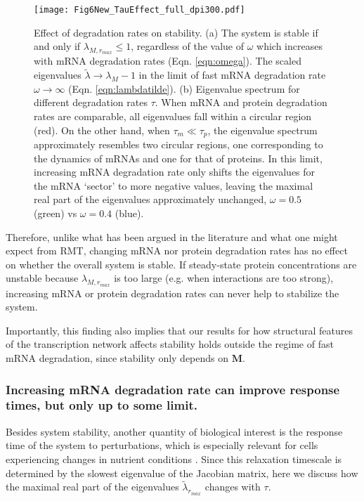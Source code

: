 \documentclass[10pt]{article}
\begin{document}
\begin{figure}[tp]
    \centering
	\texttt{[image: Fig6New\_TauEffect\_full\_dpi300.pdf]}
    \caption{Effect of degradation rates on stability. (a) The system is stable if and only if $\lambda_{M,r_{max}} \leq 1$, regardless of the value of $\omega$ which increases with mRNA degradation rates (Eqn. \ref{eqn:omega}). The scaled eigenvalues $\tilde{\lambda} \to \lambda_M - 1$ in the limit of fast mRNA degradation rate $\omega \to \infty$ (Eqn. \ref{eqn:lambdatilde}). (b) Eigenvalue spectrum for different degradation rates $\tau$. When mRNA and protein degradation rates are comparable, all eigenvalues fall within a circular region (red). On the other hand, when $\tau_m \ll \tau_p$, the eigenvalue spectrum approximately resembles two circular regions, one corresponding to the dynamics of mRNAs and one for that of proteins. In this limit, increasing mRNA degradation rate only shifts the eigenvalues for the mRNA `sector' to more negative values, leaving the maximal real part of the eigenvalues approximately unchanged, $\omega = 0.5$ (green) vs $\omega = 0.4$ (blue).}
    \label{fig:EffectofTau}
\end{figure}


Therefore, unlike what has been argued in the literature and what one might expect from RMT, changing mRNA nor protein degradation rates has no effect on whether the overall system is stable. If steady-state protein concentrations are unstable because $\lambda_{M,r_{max}}$ is too large (e.g. when interactions are too strong), increasing mRNA or protein degradation rates can never help to stabilize the system. 

Importantly, this finding also implies that our results for how structural features of the transcription network affects stability holds outside the regime of fast mRNA degradation, since stability only depends on $\mathbf{M}$.   



\subsubsection*{Increasing mRNA degradation rate can improve response times, but only up to some limit.}

Besides system stability, another quantity of biological interest is the response time of the system to perturbations, which is especially relevant for cells experiencing changes in nutrient conditions \cite{van2014lost, erickson2017global}. Since this relaxation timescale is determined by the slowest eigenvalue of the Jacobian matrix, here we discuss how the maximal real part of the eigenvalues $\tilde{\lambda}_{r_{max}}$ changes with $\tau$.
\end{document}
